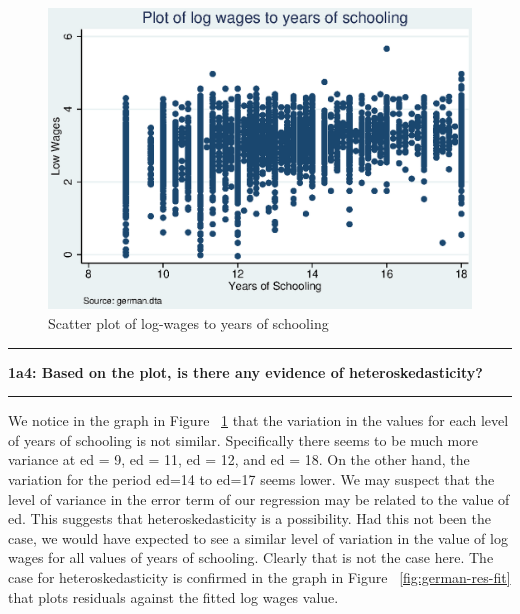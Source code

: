 \documentclass[12pt]{article}
\newcommand\question[2]{\vspace{1em}\hrule\vspace{1em}\textbf{#1: #2}\vspace{1em}\hrule\vspace{1em}}
\begin{document}
\begin{figure}[h]
\begin{centering}
  \includegraphics[width=\textwidth]{german-lnw-ed}
  \caption{Scatter plot of log-wages to years of schooling}
   \label{fig:german-lnw-ed}
\end{centering}
\end{figure}

\question{1a4}{Based on the plot, is there any evidence of heteroskedasticity?  }
We notice in the graph in Figure ~\ref{fig:german-lnw-ed} that the variation in the values for each level of years of schooling is not similar. Specifically there seems to be much more variance at ed = 9, ed = 11, ed = 12, and ed = 18. On the other hand, the variation for the period ed=14 to ed=17 seems lower. We may suspect that the level of variance in the error term of our regression may be related to the value of ed. This suggests that heteroskedasticity is a possibility. Had this not been the case, we would have expected to see a similar level of variation in the value of log wages for all values of years of schooling. Clearly that is not the case here. The case for heteroskedasticity is confirmed in the graph in Figure ~\ref{fig:german-res-fit} that plots residuals against the fitted log wages value.
\end{document}
